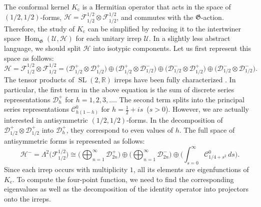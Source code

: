 \documentclass[12pt]{article}
\newcommand{\calC}{\mathcal{C}}
\newcommand{\calD}{\mathcal{D}}
\newcommand{\calF}{\mathcal{F}}
\newcommand{\calH}{\mathcal{H}}
\newcommand{\calU}{\mathcal{U}}
\newcommand{\RR}{\mathbb{R}}
\DeclareMathOperator{\SL}{SL}
\newcommand{\GG}{\mathfrak{G}}
\newcommand{\cc}{\mathrm{c}}
\begin{document}
The conformal kernel $K_{\cc}$ is a Hermitian operator that acts in the space of $(1/2,1/2)$-forms, $\calH=\calF^{1/2}_{1/2}\otimes\calF^{1/2}_{1/2}$, and commutes with the $\GG$-action. Therefore, the study of $K_{\cc}$ can be simplified by reducing it to the intertwiner space $\operatorname{Hom}_{\GG}(\calU,\calH)$ for each unitary irrep $\calU$. In a slightly less abstract language, we should split $\calH$ into isotypic components. Let us first represent this space as follows:
\begin{equation}\label{Hdecomp}
\calH=\calF^{1/2}_{1/2}\otimes\calF^{1/2}_{1/2}
=\bigl(\calD^{+}_{1/2}\otimes\calD^{+}_{1/2}\bigr)
\oplus\bigl(\calD^{+}_{1/2}\otimes\calD^{-}_{1/2}\bigr)
\oplus\bigl(\calD^{-}_{1/2}\otimes\calD^{+}_{1/2}\bigr)
\oplus\bigl(\calD^{-}_{1/2}\otimes\calD^{-}_{1/2}\bigr).
\end{equation}
The tensor products of $\SL(2,\RR)$ irreps have been fully characterized \cite{Rep76,Rep78}. In particular, the first term in the above equation is the sum of discrete series representations $\calD^{+}_{h}$ for $h=1,2,3,\ldots$. The second term splits into the principal series representations $\calC^{0}_{h(1-h)}$ for $h=\frac{1}{2}+is$\, ($s>0$). However, we are actually interested in antisymmetric $(1/2,1/2)$-forms. In the decomposition of ${\calD^{+}_{1/2}\otimes\calD^{+}_{1/2}}$ into $\calD^{+}_{h}$, they correspond to even values of $h$. The full space of antisymmetric forms is represented as follows:
\begin{equation}
\calH^{-}=\Lambda^{2}\bigl(\calF^{1/2}_{1/2}\bigr)\cong
\biggl(\bigoplus_{n=1}^{\infty}\calD^{+}_{2n}\biggr)\oplus
\biggl(\bigoplus_{n=1}^{\infty}\calD^{-}_{2n}\biggr)\oplus
\biggl(\int_{s=0}^{\infty}\calC^{0}_{1/4+s^2}\,ds\biggr).
\end{equation}
Since each irrep occurs with multiplicity $1$, all its elements are eigenfunctions of $K_{\cc}$. To compute the four-point function, we need to find the corresponding eigenvalues as well as the decomposition of the identity operator into projectors onto the irreps.
\end{document}
